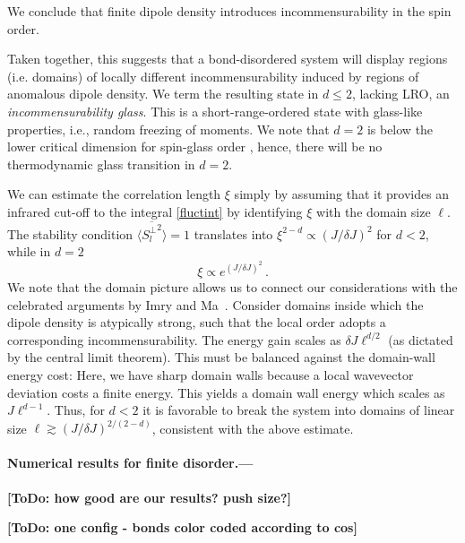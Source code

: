 \documentclass[twocolumn,english,aps,showpacs,prl,floatfix]{revtex4-1}
\newcommand{\todo}[1]{{\color{red} {\bf [ToDo: #1]}}}
\begin{document}
We conclude that finite dipole density introduces incommensurability in the spin order.

Taken together, this suggests that a bond-disordered system will display regions (i.e. domains) of locally different incommensurability induced by regions of anomalous dipole density. We term the resulting state in $d\leq 2$, lacking LRO, an \emph{incommensurability glass}. This is a short-range-ordered state with glass-like properties, i.e., random freezing of moments.
%
We note that $d=2$ is below the lower critical dimension for spin-glass order \cite{parisi17}, hence, there will be no thermodynamic glass transition in $d=2$.

We can estimate the correlation length $\xi$ simply by assuming that it provides an infrared cut-off to the integral \eqref{fluctint} by identifying $\xi$ with the domain size $\ell$. The stability condition $\overline{\langle {S_{l}^{\perp}}^2\rangle }=1$ translates into $\xi^{2-d} \propto (J/\delta J)^2$ for $d<2$, while in $d=2$
\begin{equation}
\xi \propto e^{(J/\delta J)^2}\,.
\label{xi}
\end{equation}
We note that the domain picture allows us to connect our considerations with the celebrated arguments by Imry and Ma~\cite{imry_ma}. Consider domains inside which the dipole density is atypically strong, such that the local order adopts a corresponding incommensurability. The energy gain scales as $\delta J\ell^{d/2}$ (as dictated by the central limit theorem). This must be balanced against the domain-wall energy cost: Here, we have sharp domain walls because a local wavevector deviation costs a finite energy. This yields a domain wall energy which scales as $J\ell^{d-1}$. Thus, for $d<2$ it is favorable to break the system into domains of linear size $\ell\gtrsim\left(J/\delta J\right)^{2/(2-d)}$, consistent with the above estimate.



\paragraph{Numerical results for finite disorder.---}

\todo{how good are our results? push size?}

\todo{one config - bonds color coded according to cos}

\end{document}
